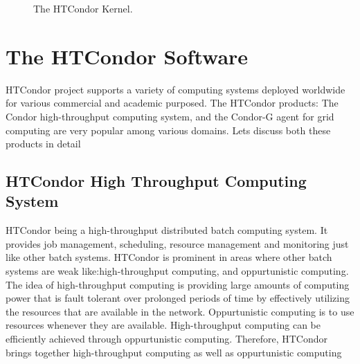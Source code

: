 \documentclass[9pt,twocolumn,twoside]{styles/osajnl}
\begin{document}


\begin{figure}[htbp]
\centering
{}
\caption{The HTCondor Kernel.}
\label{fig:false-color}
\end{figure}

\section{The HTCondor Software}
HTCondor project supports a variety of computing systems deployed
worldwide for various commercial and academic purposed. The HTCondor
products: The Condor high-throughput computing system, and the
Condor-G agent for grid computing are very popular among various
domains. Lets discuss both these products in detail


\subsection{HTCondor High Throughput Computing System}
HTCondor being a high-throughput distributed batch computing system.
It provides job management, scheduling, resource management and
monitoring just like other batch systems. HTCondor is prominent in
areas where other batch systems are weak like:high-throughput
computing, and oppurtunistic computing. The idea of high-throughput
computing is providing large amounts of computing power that is fault
tolerant over prolonged periods of time by effectively utilizing the
resources that are available in the network. Oppurtunistic computing
is to use resources whenever they are available. High-throughput
computing can be efficiently achieved through oppurtunistic
computing. Therefore, HTCondor brings together high-throughput
computing as well as oppurtunistic computing
\end{document}
